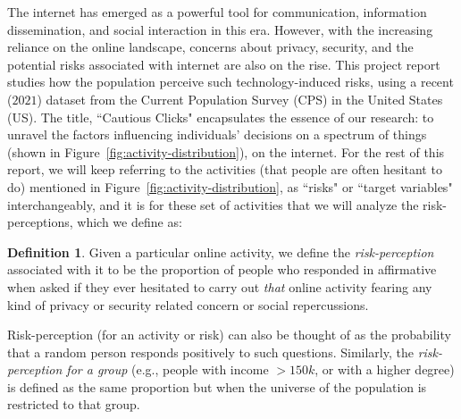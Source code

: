 \documentclass{article}
\theoremstyle{plain}
\theoremstyle{definition}
\newtheorem{definition}[theorem]{Definition}
\theoremstyle{remark}
\newcommand{\swagatam}[1]{{\color{orange}\bf [SH: #1]}}
\begin{document}
The internet has emerged as a powerful tool for communication, information dissemination, and social interaction in this era. However, with the increasing reliance on the online landscape, concerns about privacy, security, and the potential risks associated with internet are also on the rise. This project report studies how the population perceive such technology-induced risks, using a recent ($2021$) dataset from the Current Population Survey (CPS) in the United States (US). The title, ``Cautious Clicks" encapsulates the essence of our research: to unravel the 
factors influencing individuals' decisions on a spectrum of things (shown in Figure~\ref{fig:activity-distribution}), 
on the internet. For the rest of this report, we will keep referring to the activities (that people are often hesitant to do) mentioned in Figure~\ref{fig:activity-distribution}, as ``risks" or ``target variables" interchangeably, and it is for these set of activities that we will analyze the risk-perceptions, which we define as:

\begin{definition}
\label{def:risk-perception}
Given a particular online activity, we define the \emph{risk-perception} associated with it to be the proportion of people who responded in affirmative when asked if they ever hesitated to carry out \emph{that} online activity fearing any kind of privacy or security related concern or social repercussions.
\end{definition}
Risk-perception (for an activity or risk) can also be thought of as the probability that a random person responds positively to such questions. Similarly, the \emph{risk-perception for a group} (e.g., people with income $> 150k$, or with a higher degree) is defined as the same proportion but when the universe of the population is restricted to that group.



\end{document}
